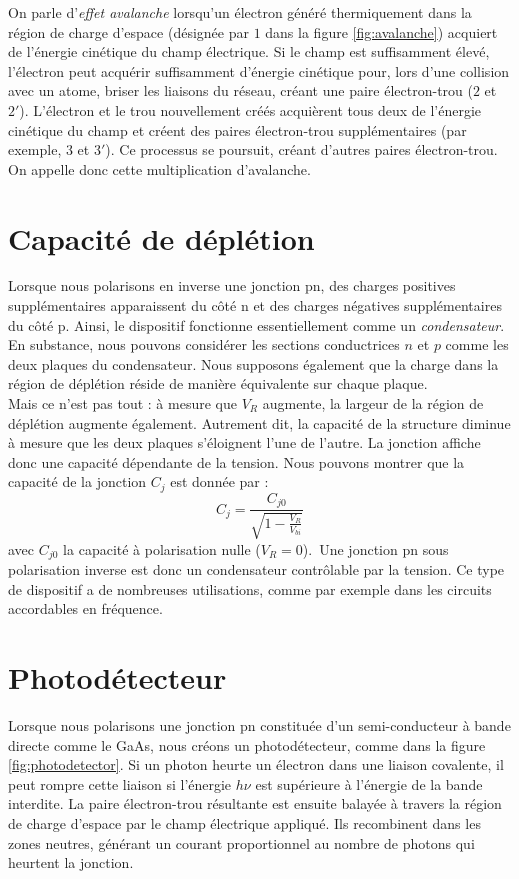 On parle d'\emph{effet avalanche} lorsqu'un électron généré thermiquement dans la région de charge d'espace (désignée par $1$ dans la figure \ref{fig:avalanche}) acquiert de l'énergie cinétique du champ électrique. Si le champ est suffisamment élevé, l'électron peut acquérir suffisamment d'énergie cinétique pour, lors d'une collision avec un atome, briser les liaisons du réseau, créant une paire électron-trou ($2$ et $2'$). L'électron et le trou nouvellement créés acquièrent tous deux de l'énergie cinétique du champ et créent des paires électron-trou supplémentaires (par exemple, $3$ et $3'$). Ce processus se poursuit, créant d'autres paires électron-trou. On appelle donc cette multiplication d'avalanche.

\section{Capacité de déplétion}
\label{sec:depletion_capacitance}

Lorsque nous polarisons en inverse une jonction pn, des charges positives supplémentaires apparaissent du côté n et des charges négatives supplémentaires du côté p. Ainsi, le dispositif fonctionne essentiellement comme un \emph{condensateur}. En substance, nous pouvons considérer les sections conductrices $n$ et $p$ comme les deux plaques du condensateur. Nous supposons également que la charge dans la région de déplétion réside de manière équivalente sur chaque plaque.\\
Mais ce n'est pas tout : à mesure que $V_R$ augmente, la largeur de la région de déplétion augmente également. Autrement dit, la capacité de la structure diminue à mesure que les deux plaques s'éloignent l'une de l'autre. La jonction affiche donc une capacité dépendante de la tension. Nous pouvons montrer que la capacité de la jonction $C_j$ est donnée par :
\begin{equation}
	C_j = \frac{C_{j0}}{\sqrt{1 - \frac{V_R}{V_{bi}}}}
\end{equation}
avec $C_{j0}$ la capacité à polarisation nulle ($V_R = 0$).\
Une jonction pn sous polarisation inverse est donc un condensateur contrôlable par la tension. Ce type de dispositif a de nombreuses utilisations, comme par exemple dans les circuits accordables en fréquence.

\section{Photodétecteur}
Lorsque nous polarisons une jonction pn constituée d'un semi-conducteur à bande directe comme le GaAs, nous créons un photodétecteur, comme dans la figure \ref{fig:photodetector}. Si un photon heurte un électron dans une liaison covalente, il peut rompre cette liaison si l'énergie $h \nu$ est supérieure à l'énergie de la bande interdite. La paire électron-trou résultante est ensuite balayée à travers la région de charge d'espace par le champ électrique appliqué. Ils recombinent dans les zones neutres, générant un courant proportionnel au nombre de photons qui heurtent la jonction.


